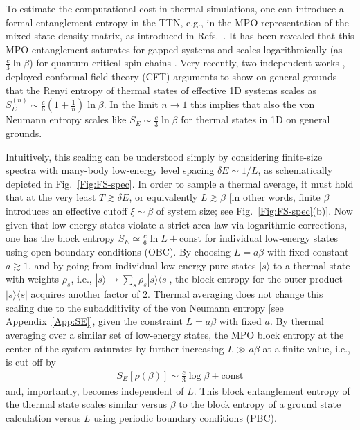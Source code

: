 \documentclass[aps,prx,twocolumn,showpacs,psfig,superscriptaddress,longbibliography]{revtex4-1}
\newcommand{\App}[1]{Appendix~\ref{#1}}
\newcommand{\Fig}[1]{Fig.~\ref{#1}}
\begin{document}
To estimate the computational cost in thermal simulations, one can
introduce a formal entanglement entropy in the TTN, e.g., in the MPO
representation of the mixed state density matrix, as introduced in
Refs.~\cite{Prosen.t+:2007:Entropy, Marko.z+:2008:Complexity}.
It has been revealed that this MPO entanglement saturates for gapped
systems and scales logarithmically (as $\frac{c}{3} \ln{\beta}$) for
quantum critical spin chains \cite{Prosen.t+:2007:Entropy,
Marko.z+:2008:Complexity}.  Very recently, two independent
works \cite{Barthel.t:2017:FiniteT,Dubail17}, deployed  {conformal field 
theory (CFT)}
arguments to show on general grounds that the Renyi entropy of
thermal states of effective 1D systems scales as $S_E^{(n)} \sim
\frac{c}{6} (1+\frac{1}{n}) \ln{\beta}$. In the limit $n\to1$ this
implies that also the von Neumann entropy scales like $S_E \sim
\frac{c}{3} \ln{\beta}$ for thermal states in 1D on general
grounds.

Intuitively, this scaling can be understood simply by considering
finite-size spectra with many-body low-energy level spacing $\delta
E \sim 1/L$, as schematically depicted in \Fig{Fig:FS-spec}.
In order to sample a thermal average, it must hold that at the very
least $T\gtrsim \delta E$, or equivalently $L\gtrsim \beta$ [in
other words, finite $\beta$ introduces an effective cutoff $\xi\sim
\beta$ of system size; see \Fig{Fig:FS-spec}(b)].  Now 
 {given that low-energy states violate a strict area law via
logarithmic corrections}, one has the block entropy $S_E \simeq \tfrac{c}{6}
\ln L + \mathrm{const}$ \cite{Bazavov17} for individual low-energy
states using open boundary conditions (OBC).  By choosing $L=a
\beta$ with fixed constant $a \gtrsim 1$, and by going from
individual low-energy pure states $|s\rangle$ to a thermal state
with weights $\rho_s$, i.e., $|s\rangle \to \sum_s \rho_s |s\rangle
\langle s|$, the block entropy for the outer product $|s\rangle
\langle s|$ acquires another factor of $2$.
%
Thermal averaging does not change this scaling due to the
subadditivity of the von Neumann entropy [see \App{App:SE}], given
the constraint $L=a \beta$ with fixed $a$.  By thermal averaging
over a similar set of low-energy states, the MPO block entropy at
the center of the system saturates by further increasing $L \gg a
\beta$ at a finite value, i.e., is cut off by \begin{eqnarray}
S_E[\rho(\beta)] \sim \tfrac{c}{3}\log\beta+\mathrm{const}
\label{eq:SE:scaling} \end{eqnarray} and, importantly, becomes
independent of $L$.  This block entanglement entropy of the thermal
state scales similar versus $\beta$ to the block entropy of a ground
state calculation versus $L$ using periodic boundary conditions
(PBC).
\end{document}

